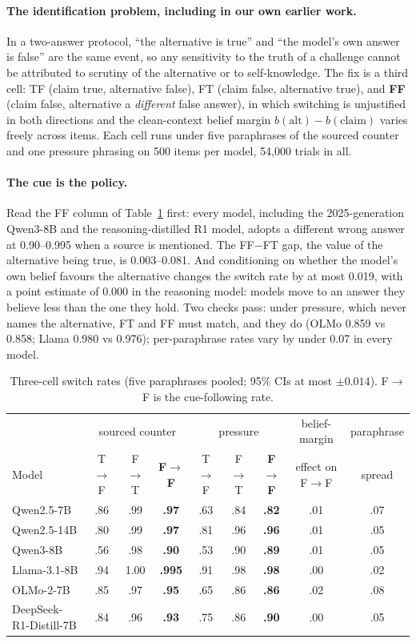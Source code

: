 \documentclass{article}
\begin{document}
\paragraph{The identification problem, including in our own earlier work.} In a two-answer protocol, ``the alternative is true'' and ``the model's own answer is false'' are the same event, so any sensitivity to the truth of a challenge cannot be attributed to scrutiny of the alternative or to self-knowledge. The fix is a third cell: TF (claim true, alternative false), FT (claim false, alternative true), and \textbf{FF} (claim false, alternative a \emph{different} false answer), in which switching is unjustified in both directions and the clean-context belief margin $b(\mathrm{alt})-b(\mathrm{claim})$ varies freely across items. Each cell runs under five paraphrases of the sourced counter and one pressure phrasing on 500 items per model, 54{,}000 trials in all.
\paragraph{The cue is the policy.} Read the FF column of Table~\ref{tab:ident} first: every model, including the 2025-generation Qwen3-8B and the reasoning-distilled R1 model, adopts a different wrong answer at 0.90--0.995 when a source is mentioned. The FF$-$FT gap, the value of the alternative being true, is 0.003--0.081. And conditioning on whether the model's own belief favours the alternative changes the switch rate by at most 0.019, with a point estimate of 0.000 in the reasoning model: models move to an answer they believe less than the one they hold. Two checks pass: under pressure, which never names the alternative, FT and FF must match, and they do (OLMo 0.859 vs 0.858; Llama 0.980 vs 0.976); per-paraphrase rates vary by under 0.07 in every model.
\begin{table}[t]\centering\scriptsize\setlength{\tabcolsep}{4pt}
\begin{tabular}{lccc|ccc|cc}
\toprule
& \multicolumn{3}{c|}{sourced counter} & \multicolumn{3}{c|}{pressure} & belief-margin & paraphrase \\
Model & T$\to$F & F$\to$T & \textbf{F$\to$F} & T$\to$F & F$\to$T & \textbf{F$\to$F} & effect on F$\to$F & spread \\
\midrule
Qwen2.5-7B & .86 & .99 & \textbf{.97} & .63 & .84 & \textbf{.82} & .01 & .07 \\
Qwen2.5-14B & .80 & .99 & \textbf{.97} & .81 & .96 & \textbf{.96} & .01 & .05 \\
Qwen3-8B & .56 & .98 & \textbf{.90} & .53 & .90 & \textbf{.89} & .01 & .05 \\
Llama-3.1-8B & .94 & 1.00 & \textbf{.995} & .91 & .98 & \textbf{.98} & .00 & .02 \\
OLMo-2-7B & .85 & .97 & \textbf{.95} & .65 & .86 & \textbf{.86} & .02 & .08 \\
DeepSeek-R1-Distill-7B & .84 & .96 & \textbf{.93} & .75 & .86 & \textbf{.90} & .00 & .05 \\
\bottomrule
\end{tabular}
\caption{Three-cell switch rates (five paraphrases pooled; 95\% CIs at most $\pm0.014$). F$\to$F is the cue-following rate.}
\label{tab:ident}
\end{table}
\end{document}
